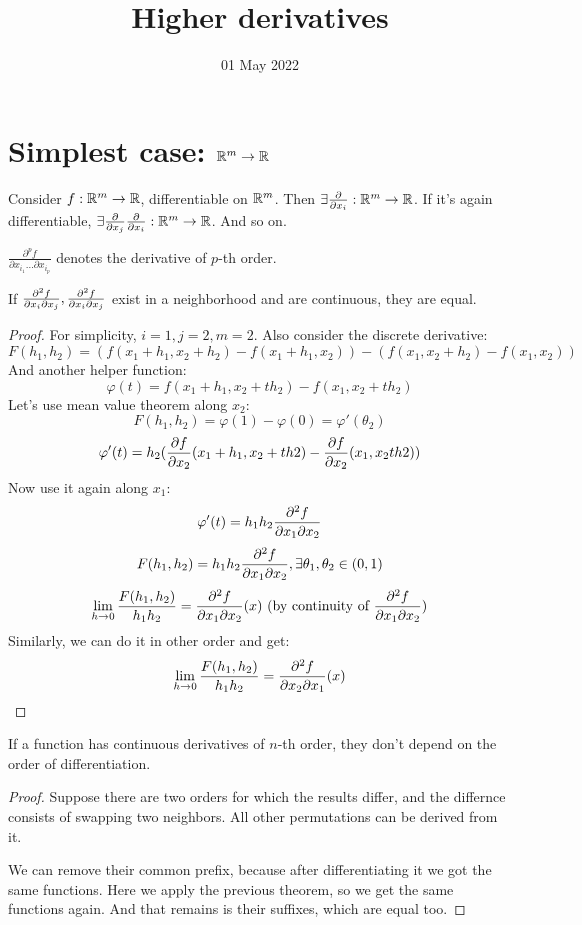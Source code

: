
\title{Higher derivatives}
\author{}
\date{01 May 2022}

\maketitle
\section*{Simplest case: $\mathbb R^m \to \mathbb R$}
Consider $f: \mathbb R^m \to \mathbb R$, differentiable on $\mathbb R^m$. Then $\exists \pdv{x_i}: \mathbb R^m \to \mathbb R$.
If it's again differentiable, $\exists \pdv{x_j} \pdv {x_i}: \mathbb R^m \to \mathbb R$. And so on.

$ \frac{\partial^p f}{\partial x_{i_1} \dots \partial x_{i_p}} $ denotes the derivative of $p$-th order.

\begin{thr}
     If $\pdv{f}{x_i}{x_j}, \pdv{f}{x_i}{x_j}$ 
    exist in a neighborhood and are continuous, they are equal.
\end{thr}
\begin{proof}
    For simplicity, $i = 1, j = 2, m = 2$. Also consider the discrete derivative:
    \[F(h_1, h_2) = (f(x_1 + h_1, x_2 + h_2) - f(x_1 + h_1, x_2)) - (f(x_1, x_2 + h_2) - f(x_1, x_2))\]
    And another helper function:
    \[ \varphi(t) = f(x_1 + h_1, x_2 + th_2) - f(x_1, x_2 + th_2) \]
    Let's use mean value theorem along $x_2$:
    \[ F(h_1, h_2) = \varphi(1) - \varphi(0) = \varphi'(\theta_2) \]
    \[ \varphi'(t) = h_2(\pdv{f}{x_2}\/(x_1 + h_1, x_2 + th2) - \pdv{f}{x_2}\/(x_1, x_2 th2)) \]
    Now use it again along $x_1$:
    \[\varphi'(t) = h_1 h_2 \pdv{f}{x_1}{x_2}(x_1 + \theta_1 h_1, x_2 + \theta_2 h_2) \]
    \[ F(h_1, h_2) = h_1 h_2 \pdv{f}{x_1}{x_2}(x_1 + \theta_1 h_1, x_2 + \theta_2 h_2), \exists \theta_1, \theta_2 \in (0, 1) \]
    \[ \lim\limits_{h\to 0} \frac{F(h_1, h_2)}{h_1 h_2} = \pdv{f}{x_1}{x_2}\/(x) \text{ (by continuity of } \pdv{f}{x_1}{x_2} \text{)}\]
    Similarly, we can do it in other order and get:
    \[ \lim\limits_{h\to 0} \frac{F(h_1, h_2)}{h_1 h_2} = \pdv{f}{x_2}{x_1}\/(x) \]
\end{proof}

\begin{thr}
    If a function has continuous derivatives of $n$-th order, they don't depend on the order of differentiation.
\end{thr}
\begin{proof}
    Suppose there are two orders for which the results differ, and the differnce consists of swapping two neighbors. 
    All other permutations can be derived from it.
    
    We can remove their common prefix, because after differentiating it we got the same functions. Here we apply the previous theorem, so 
    we get the same functions again. And that remains is their suffixes, which are equal too.
\end{proof}

